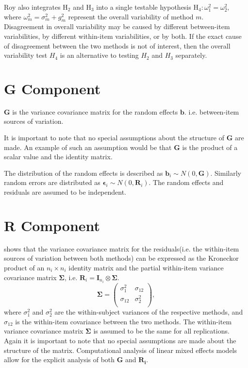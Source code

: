 \documentclass[12pt, a4paper]{report}
\theoremstyle{plain}
\theoremstyle{definition}
\theoremstyle{remark}
\begin{document}
Roy also integrates $\mathrm{H}_2$ and $\mathrm{H}_3$ into a single testable hypothesis $\mathrm{H}_4\colon \omega^2_1=\omega^2_2,$ where $\omega^2_m = \sigma^2_m + g^2_m$ represent the overall variability of method $m.$ \\
\bigskip
Disagreement in overall variability may be caused by different between-item variabilities, by different within-item variabilities, or by both.  If the exact cause of disagreement between the two methods is not of interest, then the overall variability test $H_4$ is an alternative to testing $H_2$ and $H_3$ separately.


\section{G Component}


$\boldsymbol{G}$ is the variance covariance matrix for the random effects $\boldsymbol{b}$.
i.e. between-item sources of variation.  

It is important to note that no special assumptions about the structure of $\boldsymbol{G}$ are made. An example of such an assumption would be that $\boldsymbol{G}$ is the product of a scalar value and the identity matrix.


The distribution of the random effects is described as $\boldsymbol{b}_i \sim N(0,\boldsymbol{G})$. Similarly  random errors are distributed as $\boldsymbol{\epsilon}_i \sim N(0,\boldsymbol{R}_i)$. The random effects and residuals are assumed to be independent.


\section{R Component}
\citet{hamlett} shows that the variance covariance matrix for the residuals(i.e. the within-item sources of variation between both methods) can be expressed as the Kroneckor product of an $n_i \times n_i$ identity matrix and the partial within-item variance covariance matrix $\boldsymbol{\Sigma}$, i.e. $\boldsymbol{R}_{i} = \boldsymbol{I}_{n_{i}} \otimes \boldsymbol{\Sigma}$.
\[
\boldsymbol{\Sigma} = \left( \begin{array}{cc}
\sigma^2_{1} & \sigma_{12} \\
\sigma_{12} & \sigma^2_{2} \\
\end{array}\right),
\]
where $\sigma^2_{1}$ and $\sigma^2_{2}$ are the within-subject variances of the respective methods, and $\sigma_{12}$ is the within-item covariance between the two methods. The within-item variance covariance matrix $\boldsymbol{\Sigma}$ is assumed to be the same for all replications.  Again it is important to note that no special assumptions are made about the structure of the matrix. Computational analysis of linear mixed effects models allow for the explicit analysis of both $\boldsymbol{G}$ and $\boldsymbol{R_i}$.
\end{document}
